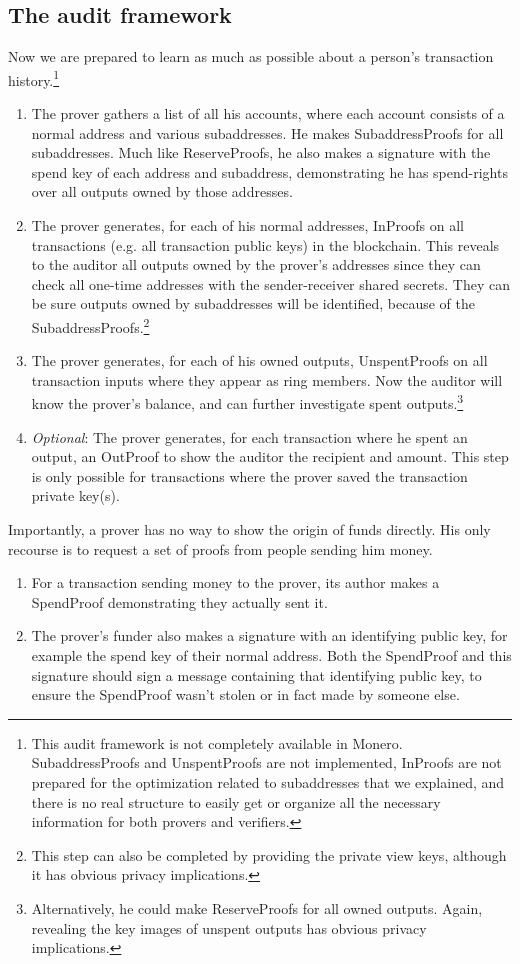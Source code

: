 \subsection{The audit framework}
\label{subsec:audit-framework}

Now we are prepared to learn as much as possible about a person's transaction history.\footnote{This audit framework is not completely available in Monero. SubaddressProofs and UnspentProofs are not implemented, InProofs are not prepared for the optimization related to subaddresses that we explained, and there is no real structure to easily get or organize all the necessary information for both provers and verifiers.}

\begin{enumerate}
    \item The prover gathers a list of all his accounts, where each account consists of a normal address and various subaddresses. He makes SubaddressProofs for all subaddresses. Much like ReserveProofs, he also makes a signature with the spend key of each address and subaddress, demonstrating he has spend-rights over all outputs owned by those addresses.
    \item The prover generates, for each of his normal addresses, InProofs on all transactions (e.g. all transaction public keys) in the blockchain. This reveals to the auditor all outputs owned by the prover's addresses since they can check all one-time addresses with the sender-receiver shared secrets. They can be sure outputs owned by subaddresses will be identified, because of the SubaddressProofs.\footnote{This step can also be completed by providing the private view keys, although it has obvious privacy implications.}
    \item The prover generates, for each of his owned outputs, UnspentProofs on all transaction inputs where they appear as ring members. Now the auditor will know the prover's balance, and can further investigate spent outputs.\footnote{Alternatively, he could make ReserveProofs for all owned outputs. Again, revealing the key images of unspent outputs has obvious privacy implications.}
    \item {\em Optional}: The prover generates, for each transaction where he spent an output, an OutProof to show the auditor the recipient and amount. This step is only possible for transactions where the prover saved the transaction private key(s).
\end{enumerate}{}

Importantly, a prover has no way to show the origin of funds directly. His only recourse is to request a set of proofs from people sending him money.

\begin{enumerate}
    \item For a transaction sending money to the prover, its author makes a SpendProof demonstrating they actually sent it.
    \item The prover's funder also makes a signature with an identifying public key, for example the spend key of their normal address. Both the SpendProof and this signature should sign a message containing that identifying public key, to ensure the SpendProof wasn't stolen or in fact made by someone else.
\end{enumerate}{}